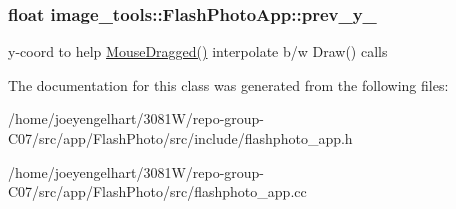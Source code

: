 \subsubsection[{\texorpdfstring{prev\+\_\+y\+\_\+}{prev_y_}}]{\setlength{\rightskip}{0pt plus 5cm}float image\+\_\+tools\+::\+Flash\+Photo\+App\+::prev\+\_\+y\+\_\+\hspace{0.3cm}{\ttfamily [private]}}\hypertarget{classimage__tools_1_1FlashPhotoApp_afeae20c1f13f61db0577f9c88aadfd01}{}\label{classimage__tools_1_1FlashPhotoApp_afeae20c1f13f61db0577f9c88aadfd01}
y-\/coord to help \hyperlink{classimage__tools_1_1FlashPhotoApp_abe6a6b7ac7664639d5208affe277f6ee}{Mouse\+Dragged()} interpolate b/w Draw() calls 

The documentation for this class was generated from the following files\+:\begin{DoxyCompactItemize}
\item 
/home/joeyengelhart/3081\+W/repo-\/group-\/\+C07/src/app/\+Flash\+Photo/src/include/flashphoto\+\_\+app.\+h\item 
/home/joeyengelhart/3081\+W/repo-\/group-\/\+C07/src/app/\+Flash\+Photo/src/flashphoto\+\_\+app.\+cc\end{DoxyCompactItemize}
